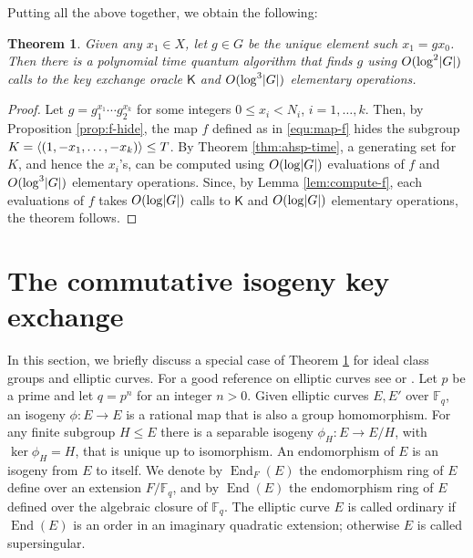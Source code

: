 \documentclass[11pt]{article}
\theoremstyle{plain}
\newtheorem{theorem}{Theorem}[section]
\theoremstyle{definition}
\DeclareMathOperator{\groupofend}{End} %
\DeclarePairedDelimiter{\abs}{\lvert}{\rvert}
\DeclarePairedDelimiter{\lrang}{\langle}{\rangle}
\def\F{\mathbb{F}}
\newcommand{\kex}{\mathsf{K}}
\begin{document}
Putting all the above together, we obtain the following:
\begin{theorem}
\label{thm:reduc}
	Given any $x_1 \in X$, let $g \in G$ be the unique element such $x_1 = gx_0$. Then there is a 
	polynomial time quantum algorithm that finds $g$ using $O(\log^2 \abs{G})$ calls to the key 
	exchange oracle $\kex$ and $O(\log^3 \abs{G})$ elementary operations.
\end{theorem}
\begin{proof}
	Let $g = g_1^{x_1} \cdots g_2^{x_k}$ for some integers $0 \le x_i < N_i$, $i = 1, \dots, k$. 
	Then, by Proposition \ref{prop:f-hide}, the map $f$ defined as in \eqref{equ:map-f} hides the 
	subgroup $K = \lrang{(1, -x_1, \dots, -x_k)} \le T$. By Theorem \ref{thm:ahsp-time}, a 
	generating set for $K$, and hence the $x_i$'s, can be computed using $O(\log \abs{G})$ 
	evaluations of $f$ and $O(\log^3 \abs{G})$ elementary operations. Since, by Lemma 
	\ref{lem:compute-f}, each evaluations of $f$ takes $O(\log \abs{G})$ calls to $\kex$ and $O(\log 
	\abs{G})$ elementary operations, the theorem follows.
\end{proof}









\section{The commutative isogeny key exchange}
\label{sec:csidh}

In this section, we briefly discuss a special case of Theorem \ref{thm:reduc} for ideal class groups 
and elliptic curves. For a good reference on elliptic curves see \cite{silverman2009arithmetic} or 
\cite{washington2003elliptic}. Let $p$ be a prime and let $q = p^n$ for an integer $n > 0$. Given 
elliptic curves $E, E'$ over $\F_q$, an isogeny $\phi: E \rightarrow E$ is a rational map that is 
also a group homomorphism. For any finite subgroup $H \le E$ there is a separable isogeny $\phi_H: E 
\rightarrow E / H$, with $\ker \phi_H = H$, that is unique up to isomorphism. An endomorphism of $E$ 
is an isogeny from $E$ to itself. We denote by $\groupofend_F(E)$ the endomorphism ring of $E$ define 
over an extension $F / \F_q$, and by $\groupofend(E)$ the endomorphism ring of $E$ defined over the 
algebraic closure of $\F_q$. The elliptic curve $E$ is called ordinary if $\groupofend(E)$ is an 
order in an imaginary quadratic extension; otherwise $E$ is called supersingular.
\end{document}
